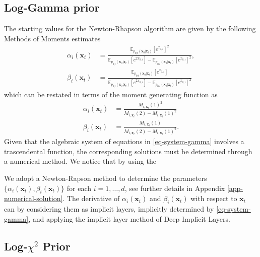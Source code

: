\subsection{Log-Gamma prior} \label{app-numerical-solution-log-gamma}
The starting values for the Newton-Rhapson algorithm are given by the following Methods of Moments estimates
\begin{equation}
\begin{aligned}
\alpha_{i}(\mathbf{x}_{t}) &= \frac{\mathbb{E}_{p_{0\vert t}(\mathbf{x}_{0}\vert \mathbf{x}_{t})}[e^{x_{0,i}}]^{2}}{\mathbb{E}_{p_{0\vert t}(\mathbf{x}_{0}\vert \mathbf{x}_{t})}[e^{2x_{0,i}}]-\mathbb{E}_{p_{0\vert t}(\mathbf{x}_{0}\vert \mathbf{x}_{t})}[e^{x_{0,i}}]^{2}},\\
\beta_{i}(\mathbf{x}_{t}) &= \frac{\mathbb{E}_{p_{0\vert t}(\mathbf{x}_{0}\vert \mathbf{x}_{t})}[e^{x_{0,i}}]}{\mathbb{E}_{p_{0\vert t}(\mathbf{x}_{0}\vert \mathbf{x}_{t})}[e^{2x_{0,i}}]-\mathbb{E}_{p_{0\vert t}(\mathbf{x}_{0}\vert \mathbf{x}_{t})}[e^{x_{0,i}}]^{2}}
\end{aligned}
\end{equation}
which can be restated in terms of the moment generating function as 
\begin{equation}
\begin{aligned}
    \alpha_{i}(\mathbf{x}_{t}) &= \frac{M_{i,\mathbf{x}_{t}}(1)^{2}}{M_{i,\mathbf{x}_{t}}(2)-M_{i,\mathbf{x}_{t}}(1)^{2}} \\
    \beta_{i}(\mathbf{x}_{t}) &= \frac{M_{i,\mathbf{x}_{t}}(1)}{M_{i,\mathbf{x}_{t}}(2)-M_{i,\mathbf{x}_{t}}(1)^{2}} .
\end{aligned}
\end{equation}
Given that the algebraic system of equations in \eqref{eq-system-gamma} involves a trascendental function, the corresponding solutions must be determined through a numerical method. We notice that by using the 


We adopt a Newton-Rapson method to determine the parameters $\{\alpha_i(\mathbf{x}_t), \beta_i(\mathbf{x}_t)\}$ for each $i=1,\ldots,d$, see further details in Appendix \ref{app-numerical-solution}.
The derivative of $\alpha_i(\mathbf{x}_t)$ and $\beta_i(\mathbf{x}_t)$ with respect to $\mathbf{x}_t$ can by considering them as implicit layers, implicitly determined by \eqref{eq-system-gamma}, and applying the implicit layer method of Deep Implicit Layers.
\subsection{Log-$\chi^{2}$ Prior}

